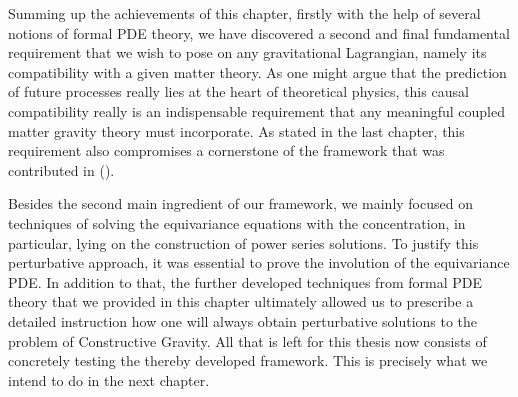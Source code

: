 Summing up the achievements of this chapter, firstly with the help of several notions of formal PDE theory, we have discovered a second and final fundamental requirement that we wish to pose on any gravitational Lagrangian, namely its compatibility with a given matter theory. As one might argue that the prediction of future processes really lies at the heart of theoretical physics, this causal compatibility really is an indispensable requirement that any meaningful coupled matter gravity theory must incorporate. As stated in the last chapter, this requirement also compromises a cornerstone of the framework that was contributed in (\cite{2018PhRvD..97h4036D}). 

Besides the second main ingredient of our framework, we mainly focused on techniques of solving the equivariance equations with the concentration, in particular, lying on the construction of power series solutions. To justify this perturbative approach, it was essential to prove the involution of the equivariance PDE. In addition to that, the further developed techniques from formal PDE theory that we provided in this chapter ultimately allowed us to prescribe a detailed instruction how one will always obtain perturbative solutions to the problem of Constructive Gravity.  All that is left for this thesis now consists of concretely testing the thereby developed framework. This is precisely what we intend to do in the next chapter.
